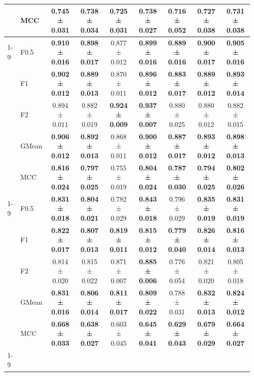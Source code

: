 \begin{table}[H]
{\begin{tabular}{llccccccc}
 & MCC & \textbf{0.745 ± 0.031} & \textbf{0.738 ± 0.034} & \textbf{0.725 ± 0.031} & \textbf{0.738 ± 0.027} & \textbf{0.716 ± 0.052} & \textbf{0.727 ± 0.038} & \textbf{0.731 ± 0.038} \\
\cline{1-9}
\multirow[t]{5}{*}{TabPFN} & F0.5 & \textbf{0.910 ± 0.016} & \textbf{0.898 ± 0.017} & 0.877 ± 0.012 & \textbf{0.899 ± 0.016} & \textbf{0.889 ± 0.016} & \textbf{0.900 ± 0.017} & \textbf{0.905 ± 0.016} \\
 & F1 & \textbf{0.902 ± 0.012} & \textbf{0.889 ± 0.013} & 0.870 ± 0.011 & \textbf{0.896 ± 0.012} & \textbf{0.883 ± 0.017} & \textbf{0.889 ± 0.012} & \textbf{0.893 ± 0.014} \\
 & F2 & 0.894 ± 0.011 & 0.882 ± 0.019 & \textbf{0.924 ± 0.009} & \textbf{0.937 ± 0.007} & 0.880 ± 0.025 & 0.880 ± 0.012 & 0.882 ± 0.015 \\
 & GMean & \textbf{0.906 ± 0.012} & \textbf{0.892 ± 0.013} & 0.868 ± 0.011 & \textbf{0.900 ± 0.012} & \textbf{0.887 ± 0.017} & \textbf{0.893 ± 0.012} & \textbf{0.898 ± 0.013} \\
 & MCC & \textbf{0.816 ± 0.024} & \textbf{0.797 ± 0.025} & 0.755 ± 0.019 & \textbf{0.804 ± 0.024} & \textbf{0.787 ± 0.030} & \textbf{0.794 ± 0.025} & \textbf{0.802 ± 0.026} \\
\cline{1-9}
\multirow[t]{5}{*}{XGBoost} & F0.5 & \textbf{0.831 ± 0.018} & \textbf{0.804 ± 0.021} & 0.782 ± 0.029 & \textbf{0.843 ± 0.018} & 0.796 ± 0.029 & \textbf{0.835 ± 0.019} & \textbf{0.831 ± 0.019} \\
 & F1 & \textbf{0.822 ± 0.017} & \textbf{0.807 ± 0.013} & \textbf{0.819 ± 0.011} & \textbf{0.815 ± 0.012} & \textbf{0.779 ± 0.040} & \textbf{0.826 ± 0.014} & \textbf{0.816 ± 0.013} \\
 & F2 & 0.814 ± 0.020 & 0.815 ± 0.022 & 0.871 ± 0.007 & \textbf{0.885 ± 0.006} & 0.776 ± 0.054 & 0.821 ± 0.020 & 0.805 ± 0.018 \\
 & GMean & \textbf{0.831 ± 0.016} & \textbf{0.806 ± 0.014} & \textbf{0.811 ± 0.017} & \textbf{0.809 ± 0.022} & 0.788 ± 0.031 & \textbf{0.832 ± 0.013} & \textbf{0.824 ± 0.012} \\
 & MCC & \textbf{0.668 ± 0.033} & \textbf{0.638 ± 0.027} & 0.603 ± 0.045 & \textbf{0.645 ± 0.041} & \textbf{0.629 ± 0.043} & \textbf{0.679 ± 0.029} & \textbf{0.664 ± 0.027} \\
\cline{1-9}
\bottomrule
\end{tabular}
    }
\end{table}
